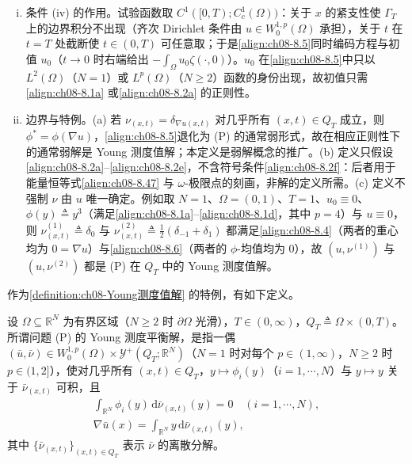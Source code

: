 \documentclass[../../main.tex]{subfiles}%
\begin{document}
\begin{remark}
\begin{enumerate}[(i)]
\item 条件 (iv) 的作用。试验函数取 $C^1([0,T);C^1_c(\Omega))$：关于 $x$ 的紧支性使 $\Gamma_T$ 上的边界积分不出现（齐次 Dirichlet 条件由 $u\in W^{1,p}_0(\Omega)$ 承担），关于 $t$ 在 $t=T$ 处截断使 $t\in(0,T)$ 可任意取；于是\eqref{align:ch08-8.5}同时编码方程与初值 $u_0$（$t\to0$ 时右端给出 $-\int_\Omega u_0\zeta(\cdot,0)$）。$u_0$ 在\eqref{align:ch08-8.5}中只以 $L^2(\Omega)$（$N=1$）或 $L^p(\Omega)$（$N\geqslant2$）函数的身份出现，故初值只需\eqref{align:ch08-8.1a} 或\eqref{align:ch08-8.2a} 的正则性。
\item 边界与特例。(a) 若 $\nu_{(x,t)}=\delta_{\nabla u(x,t)}$ 对几乎所有 $(x,t)\in Q_T$ 成立，则 $\phi^*=\phi(\nabla u)$，\eqref{align:ch08-8.5}退化为 (P) 的通常弱形式，故在相应正则性下的通常弱解是 Young 测度值解；本定义是弱解概念的推广。(b) 定义只假设\eqref{align:ch08-8.2a}--\eqref{align:ch08-8.2e}，不含符号条件\eqref{align:ch08-8.2f}：后者用于能量恒等式\eqref{align:ch08-8.47} 与 $\omega$-极限点的刻画，非解的定义所需。(c) 定义不强制 $\nu$ 由 $u$ 唯一确定。例如取 $N=1$、$\Omega=(0,1)$、$T=1$、$u_0\equiv0$、$\phi(y)\triangleq y^3$（满足\eqref{align:ch08-8.1a}--\eqref{align:ch08-8.1d}，其中 $p=4$）与 $u\equiv0$，则 $\nu^{(1)}_{(x,t)}\triangleq\delta_0$ 与 $\nu^{(2)}_{(x,t)}\triangleq\frac12(\delta_{-1}+\delta_1)$ 都满足\eqref{align:ch08-8.4}（两者的重心均为 $0=\nabla u$）与\eqref{align:ch08-8.6}（两者的 $\phi$-均值均为 $0$），故 $(u,\nu^{(1)})$ 与 $(u,\nu^{(2)})$ 都是 (P) 在 $Q_T$ 中的 Young 测度值解。
\end{enumerate}
\end{remark}

作为\cref{definition:ch08-Young测度值解} 的特例，有如下定义。

\begin{definition}\label{definition:ch08-Young平衡解}
设 $\Omega\subseteq\mathbb{R}^N$ 为有界区域（$N\geqslant2$ 时 $\partial\Omega$ 光滑），$T\in(0,\infty)$，$Q_T\triangleq\Omega\times(0,T)$。所谓问题 (P) 的 Young 测度平衡解，是指一偶 $(\bar u,\bar\nu)\in W^{1,p}_0(\Omega)\times\mathcal{Y}^+(Q_T;\mathbb{R}^N)$（$N=1$ 时对每个 $p\in(1,\infty)$，$N\geqslant2$ 时 $p\in(1,2]$），使对几乎所有 $(x,t)\in Q_T$，$y\mapsto\phi_i(y)$（$i=1,\cdots ,N$）与 $y\mapsto y$ 关于 $\bar\nu_{(x,t)}$ 可积，且
\begin{align}
\int_{\mathbb{R}^N}\phi_i(y)\,\mathrm{d}\bar\nu_{(x,t)}(y)=0\quad(i=1,\cdots ,N), \label{align:ch08-8.7}\\
\nabla\bar u(x)=\int_{\mathbb{R}^N}y\,\mathrm{d}\bar\nu_{(x,t)}(y), \label{align:ch08-8.8}
\end{align}
其中 $\{\bar\nu_{(x,t)}\}_{(x,t)\in Q_T}$ 表示 $\bar\nu$ 的离散分解。
\end{definition}
\end{document}
